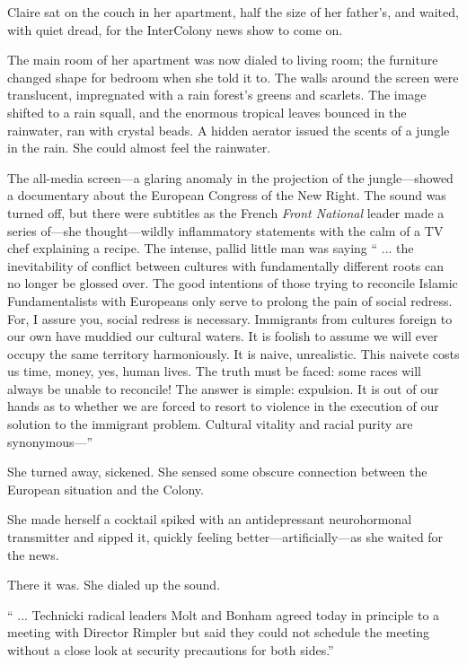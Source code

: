 Claire sat on the couch in her apartment, half the size of her father's, and waited, with quiet dread, for the InterColony news show to come on.

The main room of her apartment was now dialed to living room; the furniture changed shape for bedroom when she told it to. The walls around the screen were translucent, impregnated with a rain forest's greens and scarlets. The image shifted to a rain squall, and the enormous tropical leaves bounced in the rainwater, ran with crystal beads. A hidden aerator issued the scents of a jungle in the rain. She could almost feel the rainwater.

The all-media screen---a glaring anomaly in the projection of the jungle---showed a documentary about the European Congress of the New Right. The sound was turned off, but there were subtitles as the French \textit{Front National} leader made a series of---she thought---wildly inflammatory statements with the calm of a TV chef explaining a recipe. The intense, pallid little man was saying `` ... the inevitability of conflict between cultures with fundamentally different roots can no longer be glossed over. The good intentions of those trying to reconcile Islamic Fundamentalists with Europeans only serve to prolong the pain of social redress. For, I assure you, social redress is necessary. Immigrants from cultures foreign to our own have muddied our cultural waters. It is foolish to assume we will ever occupy the same territory harmoniously. It is naive, unrealistic. This naivete costs us time, money, yes, human lives. The truth must be faced: some races will always be unable to reconcile! The answer is simple: expulsion. It is out of our hands as to whether we are forced to resort to violence in the execution of our solution to the immigrant problem. Cultural vitality and racial purity are synonymous---''

She turned away, sickened. She sensed some obscure connection between the European situation and the Colony.

She made herself a cocktail spiked with an antidepressant neurohormonal transmitter and sipped it, quickly feeling better---artificially---as she waited for the news.

There it was. She dialed up the sound.

`` ... Technicki radical leaders Molt and Bonham agreed today in principle to a meeting with Director Rimpler but said they could not schedule the meeting without a close look at security precautions for both sides.''

